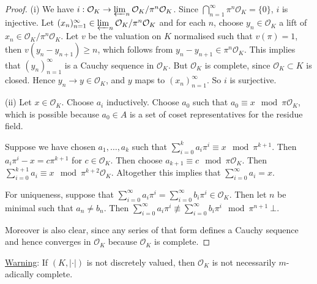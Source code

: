 \documentclass[]{article}
\theoremstyle{custhm}
\theoremstyle{cusdef}
\theoremstyle{custhm}
\theoremstyle{custhm}
\theoremstyle{custhm}
\theoremstyle{custhm}
\theoremstyle{cusdef}
\theoremstyle{remark}
\newcommand{\ra}{\rightarrow}
\newcommand{\valk}{(K,|\cdot|)}
\renewcommand{\O}{\mathcal{O}}
\begin{document}
\begin{proof}(i) We have $i:\O_K\ra\varprojlim_n \O_K/\pi^n\O_K$. Since $\bigcap_{n=1}^{\infty}\pi^n\O_K = \{0\}$, $i$ is injective. Let $(x_n)_{n=1}^{\infty}\in \varprojlim_n \O_K/\pi^n\O_K$ and for each $n$, choose $y_n\in \O_K$ a lift of $x_n\in \O_K/\pi^n\O_K$. Let $v$ be the valuation on $K$ normalised such that $v(\pi) = 1$, then $v(y_n - y_{n+1})\ge n$, which follows from $y_n-y_{n+1}\in \pi^n\O_K$. This implies that $(y_n)_{n=1}^{\infty}$ is a Cauchy sequence in $\O_K$. But $\O_K$ is complete, since $\O_K \subset K$ is closed. Hence $y_n\ra y\in \O_K$, and $y$ maps to $(x_n)_{n=1}^{\infty}$. So $i$ is surjective.
	
(ii) Let $x\in \O_K$. Choose $a_i$ inductively. Choose $a_0$ such that $a_0 \equiv x \mod \pi\O_K$, which is possible because $a_0\in A$ is a set of coset representatives for the residue field.

Suppose we have chosen $a_1,\dots,a_k$ such that $\sum_{i=0}^{k}a_i\pi^i \equiv x\mod \pi^{k+1}$. Then $a_i\pi^i - x = c\pi^{k+1}$ for $c\in \O_K$. Then choose $a_{k+1}\equiv c\mod \pi \O_K$. Then $\sum_{i=0}^{k+1}a_i \equiv x\mod \pi^{k+2}\O_K$. Altogether this implies that $\sum_{i=0}^{\infty}a_i = x$.

For uniqueness, suppose that $\sum_{i=0}^{\infty}a_i\pi^i = \sum_{i=0}^{\infty}b_i\pi^i\in \O_K$. Then let $n$ be minimal such that $a_n \ne b_n$. Then $\sum_{i=0}^{\infty}a_i\pi^i\not\equiv\sum_{i=0}^{\infty}b_i\pi^i \mod\pi^{n+1}\ \bot$.

Moreover is also clear, since any series of that form defines a Cauchy sequence and hence converges in $\O_K$ because $\O_K$ is complete.
\end{proof}

\underline{Warning}: If $\valk$ is not discretely valued, then $\O_K$ is not necessarily $m$-adically complete.
\end{document}
